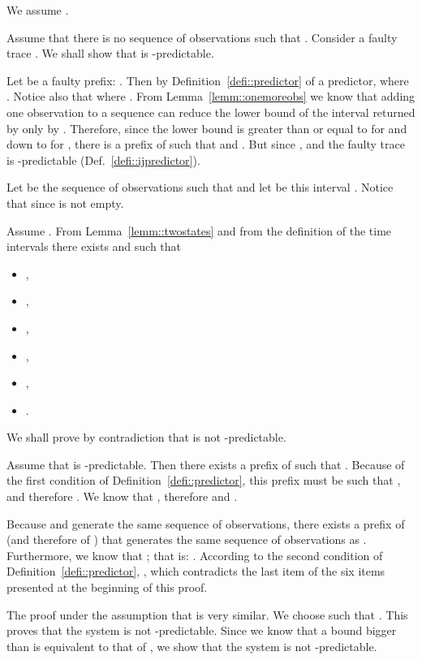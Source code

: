 \documentclass{article}
\newenvironment{proof}{\par\noindent{\bf Proof}}{\hspace{\stretch{1}}}
\begin{document}
\begin{proof}
  We assume .  

  
  Assume that there is no sequence  of observations 
  such that .  
  Consider a faulty trace .  
  We shall show that  is -predictable.  

  Let  be a faulty prefix: 
  .  
  Then by Definition~\ref{defi::predictor} of a predictor, 
   where .  
  Notice also that  where .  
  From Lemma~\ref{lemm::onemoreobs} 
  we know that adding one observation to a sequence 
  can reduce the lower bound of the interval returned by  
  only by .  
  Therefore, since the lower bound is greater than or equal to  
  for  and down to  for , 
  there is a prefix  of  
  such that  and .  
  But since , 
   and the faulty trace  
  is -predictable (Def.~\ref{defi::ijpredictor}).  


  
  Let  be the sequence of observations 
  such that  
  and let  be this interval .  
  Notice that  since  is not empty.  

  Assume .  
  From Lemma~\ref{lemm::twostates} 
  and from the definition of the time intervals 
  there exists  
  and  
  such that 
  \begin{itemize}
  \item 
    , 
  \item 
    , 
  \item 
    , 
  \item 
    , 
  \item 
    , 
  \item 
    .  
  \end{itemize}
  We shall prove by contradiction that  is not -predictable.  
  
  Assume that  is -predictable.  
  Then there exists a prefix  of  
  such that .  
  Because of the first condition of Definition~\ref{defi::predictor}, 
  this prefix must be such that , 
  and therefore .  
  We know that , 
  therefore  and .  

  Because  and  generate the same sequence of observations, 
  there exists a prefix  of  (and therefore of ) 
  that generates the same sequence of observations as .  
  Furthermore, we know that ; 
  that is: .  
  According to the second condition of Definition~\ref{defi::predictor}, 
  , 
  which contradicts the last item of the six items 
  presented at the beginning of this proof.  

  The proof under the assumption that  is very similar.  
  We choose  such that .  
  This proves that the system is not -predictable.  
  Since we know that a bound bigger than  is equivalent 
  to that of , we show 
  that the system is not -predictable.  
\end{proof}
\end{document}
